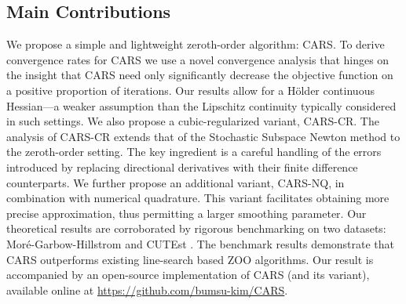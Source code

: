 \subsection{Main Contributions}
We propose a simple and lightweight zeroth-order algorithm: CARS. To derive convergence rates for CARS we use a novel convergence analysis that hinges on the insight that CARS need only significantly decrease the objective function on a positive proportion of iterations. Our results allow for a H\"{o}lder continuous Hessian---a weaker assumption than the Lipschitz continuity typically considered in such settings. We also propose a cubic-regularized variant, CARS-CR. The analysis of CARS-CR extends that of the Stochastic Subspace Newton method \cite{pmlr-v119-hanzely20a} to the zeroth-order setting. The key ingredient is a careful handling of the errors introduced by replacing directional derivatives with their finite difference counterparts. We further propose an additional variant, CARS-NQ, in combination with numerical quadrature. This variant facilitates obtaining more precise approximation, thus permitting a larger smoothing parameter. Our theoretical results are corroborated by rigorous benchmarking on two datasets: Mor\'{e}-Garbow-Hillstrom \cite{more1981testing} and CUTEst \cite{gould2015cutest}. The benchmark results demonstrate that CARS outperforms existing line-search based ZOO algorithms. Our result is accompanied by an open-source implementation of CARS (and its variant), available online at \url{https://github.com/bumsu-kim/CARS}.